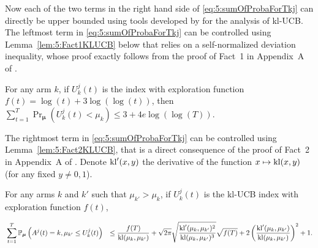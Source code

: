 \begin{smallproof}
  Now each of the two terms in the right hand side of \eqref{eq:5:sumOfProbaForTkj} can directly be upper bounded using tools developed by \cite{KLUCBJournal} for the analysis of kl-UCB.
  The leftmost term in \eqref{eq:5:sumOfProbaForTkj} can be controlled using Lemma~\ref{lem:5:Fact1KLUCB} below that relies on a self-normalized deviation inequality, whose proof exactly follows from the proof of Fact~1 in Appendix~A of \cite{KLUCBJournal}.

  \begin{lemma}\label{lem:5:Fact1KLUCB}
  \begin{leftbar}[lemmabar]  %
      For any arm $k$, if $U_k^{j}(t)$ is the \klUCB{} index with exploration function $f(t)=\log(t)+3\log(\log(t))$, then
      $\sum\limits_{t=1}^T \Pr_{\bm{\mu}} \left(U_k^{j}(t) < \mu_k\right) \leq 3 + 4e \log(\log(T))$.
  \end{leftbar}  %
  \end{lemma}

  The rightmost term in \eqref{eq:5:sumOfProbaForTkj} can be controlled using Lemma~\ref{lem:5:Fact2KLUCB}, that is a direct consequence of the proof of Fact~2 in Appendix~A of \cite{KLUCBJournal}.
  Denote $\mathrm{kl}'(x,y)$ the derivative of the function $x \mapsto \mathrm{kl}(x,y)$ (for any fixed $y\neq 0, 1$).

  \begin{lemma}\label{lem:5:Fact2KLUCB}
  \begin{leftbar}[lemmabar]  %
    For any arms $k$ and $k'$ such that $\mu_{k'} > \mu_{k}$, if $U_k^{j}(t)$ is the kl-UCB index with exploration function $f(t)$,
    \begin{small} %
      \begin{align*}
        &\sum_{t=1}^T\mathbb{P}_{\bm{\mu}} \left( A^j(t) = k, \mu_{k'} \leq U_k^{j}(t) \right) & \leq  \frac{f(T)}{\mathrm{kl}(\mu_k,\mu_{k'})}
        + \sqrt{2\pi} \sqrt{\frac{\mathrm{kl}'(\mu_k,\mu_{k'})^2}{\mathrm{kl}(\mu_k,\mu_{k'})^3}}\sqrt{f(T)} + 2\left(\frac{\mathrm{kl}'(\mu_k,\mu_{k'})}{\mathrm{kl}(\mu_k,\mu_{k'})}\right)^2 + 1.
      \end{align*}
    \end{small} %
\end{leftbar}  %
\end{lemma}


\end{smallproof}
